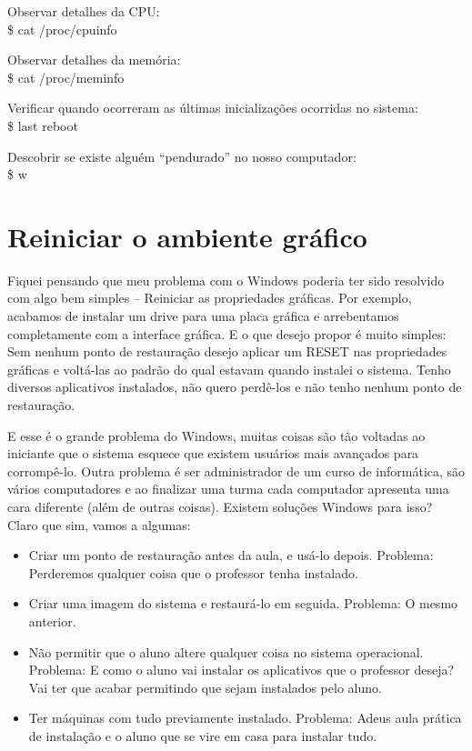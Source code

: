 Observar detalhes da CPU: \\
{\ttfamily\$ cat /proc/cpuinfo}

Observar detalhes da memória: \\
{\ttfamily\$ cat /proc/meminfo}

Verificar quando ocorreram as últimas inicializações ocorridas no sistema: \\
{\ttfamily\$ last reboot}

Descobrir se existe alguém ``pendurado'' no nosso computador: \\
{\ttfamily\$ w}

\section{Reiniciar o ambiente gráfico}
Fiquei pensando que meu problema com o Windows poderia ter sido resolvido com algo bem simples – Reiniciar as propriedades gráficas. Por exemplo, acabamos de instalar um drive para uma placa gráfica e arrebentamos completamente com a interface gráfica. E o que desejo propor é muito simples: Sem nenhum ponto de restauração desejo aplicar um RESET nas propriedades gráficas e voltá-las ao padrão do qual estavam quando instalei o sistema. Tenho diversos aplicativos instalados, não quero perdê-los e não tenho nenhum ponto de restauração.

E esse é o grande problema do Windows, muitas coisas são tão voltadas ao iniciante que o sistema esquece que existem usuários mais avançados para corrompê-lo. Outra problema é ser administrador de um curso de informática, são vários computadores e ao finalizar uma turma cada computador apresenta uma cara diferente (além de outras coisas). Existem soluções Windows para isso? Claro que sim, vamos a algumas: \vspace{-1em}
\begin{itemize}[noitemsep]
 \item Criar um ponto de restauração antes da aula, e usá-lo depois. Problema: Perderemos qualquer coisa que o professor tenha instalado. 
 \item Criar uma imagem do sistema e restaurá-lo em seguida. Problema: O mesmo anterior. 
 \item Não permitir que o aluno altere qualquer coisa no sistema operacional. Problema: E como o aluno vai instalar os aplicativos que o professor deseja? Vai ter que acabar permitindo que sejam instalados pelo aluno.
 \item Ter máquinas com tudo previamente instalado. Problema: Adeus aula prática de instalação e o aluno que se vire em casa para instalar tudo.
\end{itemize}

